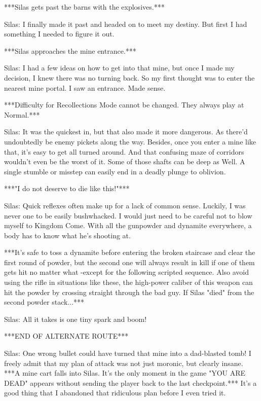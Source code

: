 \documentclass{article}
\begin{document}
***Silas gets past the barns with the explosives.***

Silas: I finally made it past and headed on to meet my destiny. But first I had something I needed to figure it out.

***Silas approaches the mine entrance.***

Silas: I had a few ideas on how to get into that mine, but once I made my decision, I knew there was no turning back. So my first thought was to enter the nearest mine portal. I saw an entrance. Made sense.

***Difficulty for Recollections Mode cannot be changed. They always play at Normal.***

Silas: It was the quickest in, but that also made it more dangerous. As there'd undoubtedly be enemy pickets along the way. Besides, once you enter a mine like that, it's easy to get all turned around. And that confusing maze of corridors wouldn't even be the worst of it. Some of those shafts can be deep as Well. A single stumble or misstep can easily end in a deadly plunge to oblivion.

***"I do not deserve to die like this!"***

Silas: Quick reflexes often make up for a lack of common sense. Luckily, I was never one to be easily bushwhacked. I would just need to be careful not to blow myself to Kingdom Come. With all the gunpowder and dynamite everywhere, a body has to know what he's shooting at.

***It's safe to toss a dynamite before entering the broken staircase and clear the first round of powder, but the second one will always result in kill if one of them gets hit no matter what -except for the following scripted sequence. Also avoid using the rifle in situations like these, the high-power caliber of this weapon can hit the powder by crossing straight through the bad guy. If Silas "died" from the second powder stack...***

Silas: All it takes is one tiny spark and boom!

***END OF ALTERNATE ROUTE***

Silas: One wrong bullet could have turned that mine into a dad-blasted tomb! I freely admit that my plan of attack was not just moronic, but clearly insane. ***A mine cart falls into Silas. It's the only moment in the game "YOU ARE DEAD" appears without sending the player back to the last checkpoint.*** It's a good thing that I abandoned that ridiculous plan before I even tried it.
\end{document}
